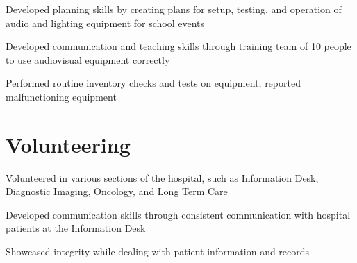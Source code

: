 \documentclass[]{resume-openfont}
\begin{document}
\begin{minipage}[t]{0.66\textwidth}
\begin{tightemize}
\item Developed planning skills by creating plans for setup, testing, and operation of audio and lighting equipment for school events \item Developed communication and teaching skills through training team of 10 people to use audiovisual equipment correctly \item Performed routine inventory checks and tests on equipment, reported malfunctioning equipment\end{tightemize}
\sectionsep


\section{Volunteering}
\begin{tightemize}
\item Volunteered in various sections of the hospital, such as Information Desk, Diagnostic Imaging, Oncology, and Long Term Care \item Developed communication skills through consistent communication with hospital patients at the Information Desk \item Showcased integrity while dealing with patient information and records\end{tightemize}
\sectionsep


\end{minipage} 
\end{document}
